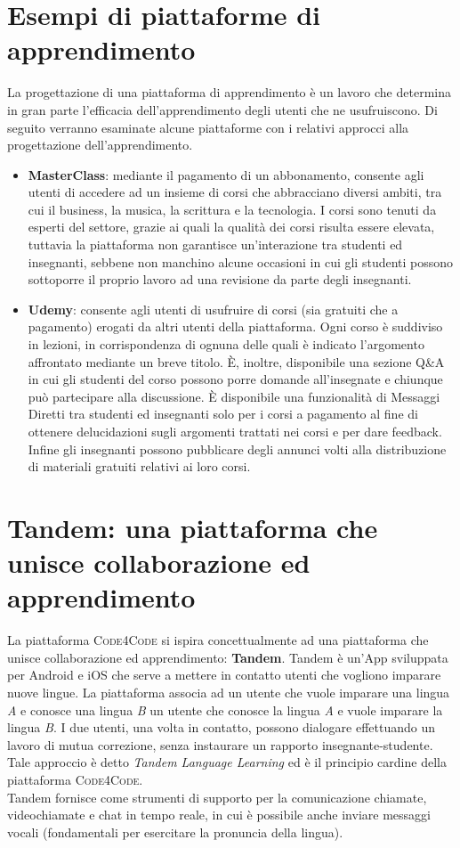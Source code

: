 \section{Esempi di piattaforme di apprendimento}
La progettazione di una piattaforma di apprendimento è un lavoro che determina in gran parte l'efficacia dell'apprendimento degli utenti che ne usufruiscono. Di seguito verranno esaminate alcune piattaforme con i relativi approcci alla progettazione dell'apprendimento.
\begin{itemize}    
    \item{\textbf{MasterClass}: mediante il pagamento di un abbonamento, consente agli utenti di accedere ad un insieme di corsi che abbracciano diversi ambiti, tra cui il business, la musica, la scrittura e la tecnologia. I corsi sono tenuti da esperti del settore, grazie ai quali la qualità dei corsi risulta essere elevata, tuttavia la piattaforma non garantisce un'interazione tra studenti ed insegnanti, sebbene non manchino alcune occasioni in cui gli studenti possono sottoporre il proprio lavoro ad una revisione da parte degli insegnanti.}
    \item{\textbf{Udemy}: consente agli utenti di usufruire di corsi (sia gratuiti che a pagamento) erogati da altri utenti della piattaforma. Ogni corso è suddiviso in lezioni, in corrispondenza di ognuna delle quali è indicato l'argomento affrontato mediante un breve titolo. È, inoltre, disponibile una sezione Q\&A in cui gli studenti del corso possono porre domande all'insegnate e chiunque può partecipare alla discussione. È disponibile una funzionalità di Messaggi Diretti tra studenti ed insegnanti solo per i corsi a pagamento al fine di ottenere delucidazioni sugli argomenti trattati nei corsi e per dare feedback. Infine gli insegnanti possono pubblicare degli annunci volti alla distribuzione di materiali gratuiti relativi ai loro corsi.}
\end{itemize}
\section{Tandem: una piattaforma che unisce collaborazione ed apprendimento}
La piattaforma \textsc{Code4Code} si ispira concettualmente ad una piattaforma che unisce collaborazione ed apprendimento: \textbf{Tandem}. Tandem è un'App sviluppata per Android e iOS che serve a mettere in contatto utenti che vogliono imparare nuove lingue. La piattaforma associa ad un utente che vuole imparare una lingua \emph{A} e conosce una lingua \emph{B} un utente che conosce la lingua \emph{A} e vuole imparare la lingua \emph{B}. I due utenti, una volta in contatto, possono dialogare effettuando un lavoro di mutua correzione, senza instaurare un rapporto insegnante-studente. Tale approccio è detto \emph{Tandem Language Learning} \cite{tandem} ed è il principio cardine della piattaforma \textsc{Code4Code}.\\Tandem fornisce come strumenti di supporto per la comunicazione chiamate, videochiamate e chat in tempo reale, in cui è possibile anche inviare messaggi vocali (fondamentali per esercitare la pronuncia della lingua). 
